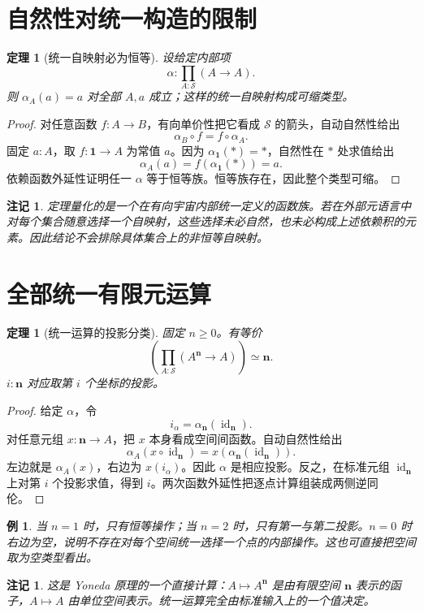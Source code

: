 \documentclass[12pt,oneside,openany,fontset=none]{ctexbook}
\theoremstyle{cn}
\newtheorem{example}[definition]{例}
\newtheorem{theorem}[definition]{定理}
\newtheorem{remark}[definition]{注记}
\numberwithin{equation}{chapter}
\newcommand{\Sp}{\mathcal S}
\newcommand{\id}{\operatorname{id}}
\newcommand{\one}{\mathbf 1}
\begin{document}
\section{自然性对统一构造的限制}
\begin{theorem}[统一自映射必为恒等]\label{thm:polymorphic-id}
设给定内部项
\[
\alpha:\prod_{A:\Sp}(A\to A).
\]
则 $\alpha_A(a)=a$ 对全部 $A,a$ 成立；这样的统一自映射构成可缩类型。
\end{theorem}
\begin{proof}
对任意函数 $f:A\to B$，有向单价性把它看成 $\Sp$ 的箭头，自动自然性给出
\[
\alpha_B\circ f=f\circ\alpha_A.
\]
固定 $a:A$，取 $f:\one\to A$ 为常值 $a$。因为 $\alpha_\one(*)=*$，自然性在 $*$ 处求值给出
\[
\alpha_A(a)=f(\alpha_\one(*))=a.
\]
依赖函数外延性证明任一 $\alpha$ 等于恒等族。恒等族存在，因此整个类型可缩。
\end{proof}
\begin{remark}
定理量化的是一个在有向宇宙内部统一定义的函数族。若在外部元语言中对每个集合随意选择一个自映射，这些选择未必自然，也未必构成上述依赖积的元素。因此结论不会排除具体集合上的非恒等自映射。
\end{remark}

\section{全部统一有限元运算}
\begin{theorem}[统一运算的投影分类]\label{thm:uniform-projections}
固定 $n\ge0$。有等价
\[
\left(\prod_{A:\Sp}(A^{\mathbf n}\to A)\right)
\simeq\mathbf n.
\]
$i:\mathbf n$ 对应取第 $i$ 个坐标的投影。
\end{theorem}
\begin{proof}
给定 $\alpha$，令
\[
i_\alpha=\alpha_{\mathbf n}(\id_{\mathbf n}).
\]
对任意元组 $x:\mathbf n\to A$，把 $x$ 本身看成空间间函数。自动自然性给出
\[
\alpha_A(x\circ\id_{\mathbf n})
=x(\alpha_{\mathbf n}(\id_{\mathbf n})).
\]
左边就是 $\alpha_A(x)$，右边为 $x(i_\alpha)$。因此 $\alpha$ 是相应投影。反之，在标准元组 $\id_{\mathbf n}$ 上对第 $i$ 个投影求值，得到 $i$。两次函数外延性把逐点计算组装成两侧逆同伦。
\end{proof}
\begin{example}
当 $n=1$ 时，只有恒等操作；当 $n=2$ 时，只有第一与第二投影。$n=0$ 时右边为空，说明不存在对每个空间统一选择一个点的内部操作。这也可直接把空间取为空类型看出。
\end{example}
\begin{remark}
这是 Yoneda 原理的一个直接计算：$A\mapsto A^{\mathbf n}$ 是由有限空间 $\mathbf n$ 表示的函子，$A\mapsto A$ 由单位空间表示。统一运算完全由标准输入上的一个值决定。
\end{remark}
\end{document}
